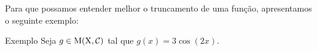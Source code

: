 \begin{comment}

\begin{env}{Exemplo}
	Seja $f \in \menfus$ tal que $f(x) = x^2-2$.
	Então o truncamento $f_2$ é representado, graficamente, como
	\begin{figure}[h!]
		\centering
		\Caption{\label{fig:representação do truncamento da função} representação do truncamento $f_2$ da função $f(x) = x^2-2$} 
		\UECEfig{}{
			\begin{tikzpicture}[scale=0.5]
				\draw[thick] (-5.5, -4.5) rectangle (6, 7);
				\def\xmin{-3}
				\def\xmax{3}
%				
				
				\draw[domain=2:4.5, thick, samples=100, red] plot (\x, {2});
				\draw[domain=-4.5:-2, thick, samples=100, red] plot (\x, {2});
				\draw[domain=-2:2, thick, samples=100, red] plot (\x, {\x*\x -2});
				\draw[domain=-2:2, thick, samples=100, red] plot (\x, {\x*\x -2});
				\draw[->] (\xmin-2,0) -- (\xmax+2,0) node[right] {$x$};
				\draw[->] (0,\xmin-1) -- (0,\xmax+2.5) node[above] {$y$};
				
				\foreach \i in {-4,-3,-2,-1,1,2,3,4}{
					\draw (\i,2pt)--(\i, -2pt) node[below]{{\footnotesize $\i$}};
				}
				
				\foreach \i in {-2, -1, 1,2,3,4,5}{
					\draw (2pt,\i)--(-2pt, \i) node[left]{{\footnotesize $\i$}};
				}
			\end{tikzpicture}
		}{
			\Fonte{Elaborado pelo autor}		}   
	\end{figure}
	
\end{env}
\end{comment}
Para que possamos entender melhor o truncamento de uma função, apresentamos o seguinte exemplo:
\pagebreak
\begin{env}{Exemplo}
	Seja $g \in \operatorname{M(X, \mathcal{C} )}$ tal que $g(x) = 3\cos(2x)$.
\end{env}
